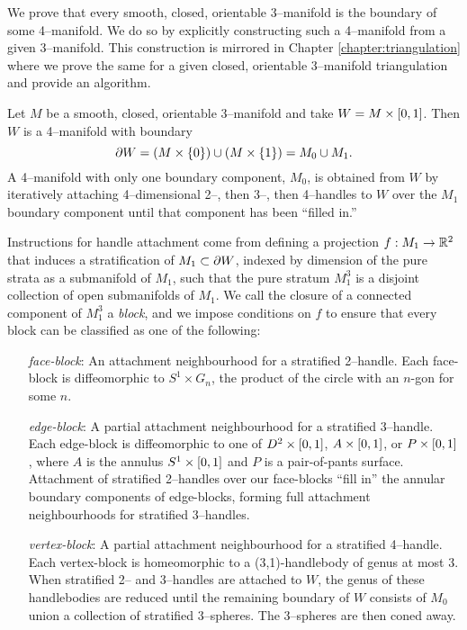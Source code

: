 \label{chapter:smooth}

We prove that every smooth, closed, orientable 3--manifold is the boundary of some 4--manifold.
We do so by explicitly constructing such a 4--manifold from a given 3--manifold.
This construction is mirrored in Chapter \ref{chapter:triangulation} where we prove the same for a given closed, orientable 3--manifold triangulation and provide an algorithm.

Let $M$ be a smooth, closed, orientable 3--manifold and take $W=M\times [0,1]$.
Then $W$ is a 4--manifold with boundary
\[
	\partial W = (M\times\{0\}) \cup (M\times\{1\}) = M_0 \cup M_1.
\]
A 4--manifold with only one boundary component, $M_0$, is obtained from $W$ by iteratively attaching 4--dimensional 2--, then 3--, then 4--handles to $W$ over the $M_1$ boundary component until that component has been ``filled in.''

Instructions for handle attachment come from defining a projection $f:M_1\to \mathbb{R}^2$ that induces a stratification of $M_1\subset\partial W$, indexed by dimension of the pure strata as a submanifold of $M_1$, such that the pure stratum $M_1^3$ is a disjoint collection of open submanifolds of $M_1$.
We call the closure of a connected component of $M_1^3$ a \emph{block}, and we impose conditions on $f$ to ensure that every block can be classified as one of the following:
\begin{enumerate}
	\item[\emph{face-block}:]
		An attachment neighbourhood for a stratified 2--handle.
		Each face-block is diffeomorphic to $S^1\times G_n$, the product of the circle with an $n$-gon for some $n$.
	
	\item[\emph{edge-block}:]
		A partial attachment neighbourhood for a stratified 3--handle.
		Each edge-block is diffeomorphic to one of $D^2\times[0,1]$, $A\times[0,1]$, or $P\times[0,1]$, where $A$ is the annulus $S^1\times[0,1]$ and $P$ is a pair-of-pants surface.
		Attachment of stratified 2--handles over our face-blocks ``fill in'' the annular boundary components of edge-blocks, forming full attachment neighbourhoods for stratified 3--handles.
		
	\item[\emph{vertex-block}:]
		A partial attachment neighbourhood for a stratified 4--handle.
		Each vertex-block is homeomorphic to a (3,1)-handlebody of genus at most 3.
		When stratified 2-- and 3--handles are attached to $W$, the genus of these handlebodies are reduced until the remaining boundary of $W$ consists of $M_0$ union a collection of stratified 3--spheres.  The 3--spheres are then coned away.
\end{enumerate}
 
